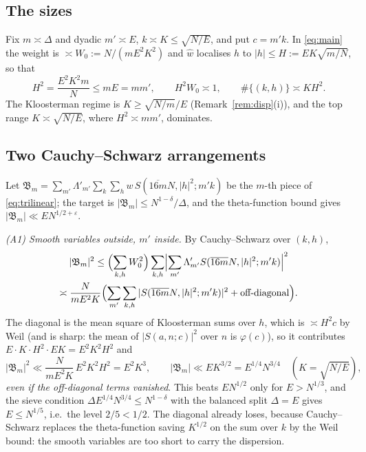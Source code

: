 \documentclass[11pt]{amsart}
\theoremstyle{remark}
\newcommand{\e}{\varepsilon}
\begin{document}
\subsection{The sizes}
Fix $m\asymp\Delta$ and dyadic $m'\asymp E$, $k\asymp K\le\sqrt{N/E}$, and put $c=m'k$. In \eqref{eq:main} the weight is $\asymp W_0:=N/(mE^2K^2)$ and $\hat w$ localises $h$ to $|h|\le H:=EK\sqrt{m/N}$, so that
\begin{equation}\label{eq:sizes}
H^2=\frac{E^2K^2m}{N}\le mE=mm',\qquad H^2W_0\asymp1,\qquad \#\{(k,h)\}\asymp KH^2 .
\end{equation}
The Kloosterman regime is $K\ge\sqrt{N/m}/E$ (Remark~\ref{rem:disp}(i)), and the top range $K\asymp\sqrt{N/E}$, where $H^2\asymp mm'$, dominates.

\subsection{Two Cauchy--Schwarz arrangements}\label{subsec:CS}
Let $\mathfrak B_m=\sum_{m'}\Lambda'_{m'}\sum_k\sum_hw\,S(\overline{16m}N,|h|^2;m'k)$ be the $m$-th piece of \eqref{eq:trilinear}; the target is $|\mathfrak B_m|\le N^{1-\delta}/\Delta$, and the theta-function bound gives $|\mathfrak B_m|\ll EN^{1/2+\e}$.

\emph{(A1) Smooth variables outside, $m'$ inside.} By Cauchy--Schwarz over $(k,h)$,
\begin{multline*}
|\mathfrak B_m|^2\le\Bigl(\sum_{k,h}W_0^2\Bigr)\sum_{k,h}\Bigl|\sum_{m'}\Lambda'_{m'}S(\overline{16m}N,|h|^2;m'k)\Bigr|^2\\
\asymp\frac{N}{mE^2K}\Bigl(\sum_{m'}\sum_{k,h}|S(\overline{16m}N,|h|^2;m'k)|^2+\text{off-diagonal}\Bigr).
\end{multline*}
The diagonal is the mean square of Kloosterman sums over $h$, which is $\asymp H^2c$ by Weil (and is sharp: the mean of $|S(a,n;c)|^2$ over $n$ is $\varphi(c)$), so it contributes $E\cdot K\cdot H^2\cdot EK=E^2K^2H^2$ and
\[
|\mathfrak B_m|^2\ll\frac{N}{mE^2K}\,E^2K^2H^2=E^2K^3,\qquad |\mathfrak B_m|\ll EK^{3/2}=E^{1/4}N^{3/4}\quad(K=\sqrt{N/E}),
\]
\emph{even if the off-diagonal terms vanished}. This beats $EN^{1/2}$ only for $E>N^{1/3}$, and the sieve condition $\Delta E^{1/4}N^{3/4}\le N^{1-\delta}$ with the balanced split $\Delta=E$ gives $E\le N^{1/5}$, i.e.\ the level $2/5<1/2$. The diagonal already loses, because Cauchy--Schwarz replaces the theta-function saving $K^{1/2}$ on the sum over $k$ by the Weil bound: the smooth variables are too short to carry the dispersion.
\end{document}
